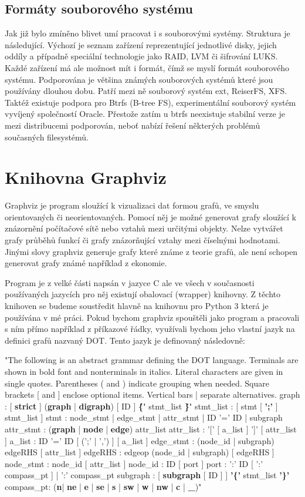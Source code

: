 \documentclass[color,table,oneside,nolot,nolof]{fithesis}
\begin{document}
\subsection{Formáty souborového systému}
  Jak již bylo zmíněno blivet umí pracovat i s souborovými systémy. Struktura je následující. Výchozí je seznam zařízení reprezentující jednotlivé disky, jejich oddíly a případně
	speciální technologie jako RAID, LVM či šifrování LUKS. Každé zařízení má ale možnost mít i formát, čímž se myslí formát souborového systému. Podporována je většina známých souborových
	systémů které jsou používány dlouhou dobu. Patří mezi ně souborový systém ext, ReiserFS, XFS. Taktéž existuje podpora pro Btrfs (B-tree FS), experimentální souborový systém 
	vyvíjený společností Oracle. Přestože zatím u btrfs neexistuje stabilní verze je mezi distribucemi podporován, neboť nabízí řešení některých problémů současných filesystémů.

\section{Knihovna Graphviz}
	Graphviz je program sloužící k vizualizaci dat formou grafů, ve smyslu orientovaných či neorientovaných. Pomocí něj je možné generovat grafy sloužící k znázornění počítačové sítě nebo
	vztahů mezi určitými objekty. Nelze vytvářet grafy průběhů funkcí či grafy znázorňující vztahy mezi číselnými hodnotami. Jinými slovy graphviz generuje grafy které známe z teorie grafů,
	ale není schopen generovat grafy známé například z ekonomie.

	Program je z velké části napsán v jazyce C ale ve všech v současnosti používaných jazycích pro něj existují obalovací (wrapper) knihovny. Z těchto knihoven se budeme soustředit hlavně na
	knihovnu pro Python 3 která je používána v mé práci. Pokud bychom graphviz spouštěli jako program a pracovali s ním přímo například z příkazové řádky, využívali bychom jeho vlastní jazyk
	na definici grafů nazvaný DOT. Tento jazyk je definovaný následovně:

	"The following is an abstract grammar defining the DOT language. Terminals are shown in bold font and nonterminals in italics. Literal characters are given in single quotes. Parentheses
	( and ) indicate grouping when needed. Square brackets [ and ] enclose optional items. Vertical bars | separate alternatives.
	graph			:		[ \textbf{strict} ] (\textbf{graph} | \textbf{digraph}) [ ID ] \textbf{\'\{\'} stmt_list \textbf{\'\}\'}
	stmt_list :		[ stmt [ \textbf{';'} ] stmt_list ]
	stmt			:		node_stmt
	|							edge_stmt
	|							attr_stmt
	|							ID '=' ID
	|							subgraph
	attr_stmt	:	(\textbf{graph} | \textbf{node} | \textbf{edge}) attr_list
	attr_list	:	'[' [ a_list ] ']' [ attr_list ]
	a_list  	:	ID '=' ID [ (';' | ',') ] [ a_list ]
	edge_stmt	:	(node_id | subgraph) edgeRHS [ attr_list ]
	edgeRHS		:	edgeop (node_id | subgraph) [ edgeRHS ]
	node_stmt	:	node_id [ attr_list ]
	node_id		:	ID [ port ]
	port			:	':' ID [ ':' compass_pt ]
	|						':' compass_pt
	subgraph	:	[ \textbf{subgraph} [ ID ] ] \textbf{'\{'} stmt_list \textbf{'\}'}
	compass_pt:	(\textbf{n}| \textbf{ne} | \textbf{e} | \textbf{se} | \textbf{s} | \textbf{sw} | \textbf{w}  | \textbf{nw} | \textbf{c} | \textbf{_})"
\end{document}
